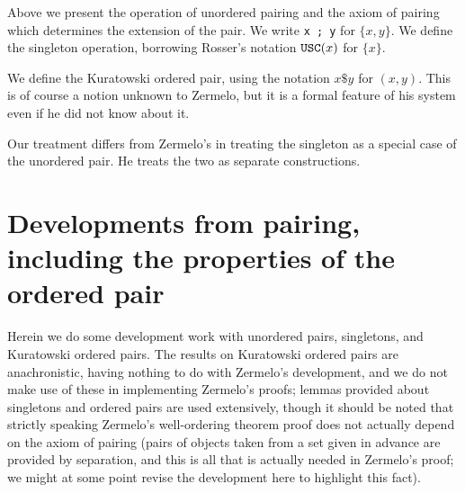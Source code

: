 \documentclass[12pt]{article}
\begin{document}
Above we present the operation of unordered pairing and the axiom of pairing which determines the extension of the pair.  We write {\tt x ; y} for $\{x,y\}$.  We define
 the singleton operation, borrowing Rosser's notation ${\tt USC}(x)$ for $\{x\}$.

We define the Kuratowski ordered pair, using the notation $x \$ y$ for $(x,y)$.  This is of course a notion unknown to Zermelo, but it is a formal feature of his system even if he did not know about it.

Our treatment differs from Zermelo's in treating the singleton as a special case of the unordered pair.  He treats the two as separate constructions.

\section{Developments from pairing, including the properties of the ordered pair}

Herein we do some development work with unordered pairs, singletons, and Kuratowski ordered pairs.  The results on Kuratowski ordered pairs are anachronistic, having nothing to do with Zermelo's development, and we do not make use  of these in implementing Zermelo's proofs;  lemmas provided about singletons and ordered pairs are used extensively, though it should be noted that strictly speaking Zermelo's well-ordering theorem proof does not actually depend on the axiom of pairing (pairs of objects taken from a set given in advance are provided by separation, and this is all that is actually needed in Zermelo's proof;  we might at some point revise the development here to highlight this fact).
\end{document}

